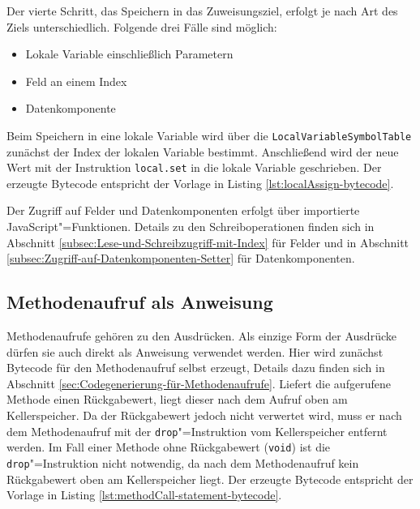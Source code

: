 Der vierte Schritt, das Speichern in das Zuweisungsziel, erfolgt je nach Art des Ziels unterschiedlich. Folgende drei Fälle sind möglich:
\begin{itemize}
    \item Lokale Variable einschließlich Parametern
    \item Feld an einem Index
    \item Datenkomponente
\end{itemize}

Beim Speichern in eine lokale Variable wird über die \lstinline{LocalVariableSymbolTable} zunächst der Index der lokalen Variable bestimmt. Anschließend wird der neue Wert mit der Instruktion \lstinline{local.set} in die lokale Variable geschrieben. Der erzeugte Bytecode entspricht der Vorlage in Listing \ref{lst:localAssign-bytecode}.



Der Zugriff auf Felder und Datenkomponenten erfolgt über importierte JavaScript"=Funktionen. Details zu den Schreiboperationen finden sich in Abschnitt \ref{subsec:Lese-und-Schreibzugriff-mit-Index} für Felder und in Abschnitt \ref{subsec:Zugriff-auf-Datenkomponenten-Setter} für Datenkomponenten.

\subsection{Methodenaufruf als Anweisung}
Methodenaufrufe gehören zu den Ausdrücken. Als einzige Form der Ausdrücke dürfen sie auch direkt als Anweisung verwendet werden. Hier wird zunächst Bytecode für den Methodenaufruf selbst erzeugt, Details dazu finden sich in Abschnitt \ref{sec:Codegenerierung-für-Methodenaufrufe}. Liefert die aufgerufene Methode einen Rückgabewert, liegt dieser nach dem Aufruf oben am Kellerspeicher. Da der Rückgabewert jedoch nicht verwertet wird, muss er nach dem Methodenaufruf mit der \lstinline{drop}"=Instruktion vom Kellerspeicher entfernt werden. Im Fall einer Methode ohne Rückgabewert (\lstinline{void}) ist die \lstinline{drop}"=Instruktion nicht notwendig, da nach dem Methodenaufruf kein Rückgabewert oben am Kellerspeicher liegt. Der erzeugte Bytecode entspricht der Vorlage in Listing \ref{lst:methodCall-statement-bytecode}.



